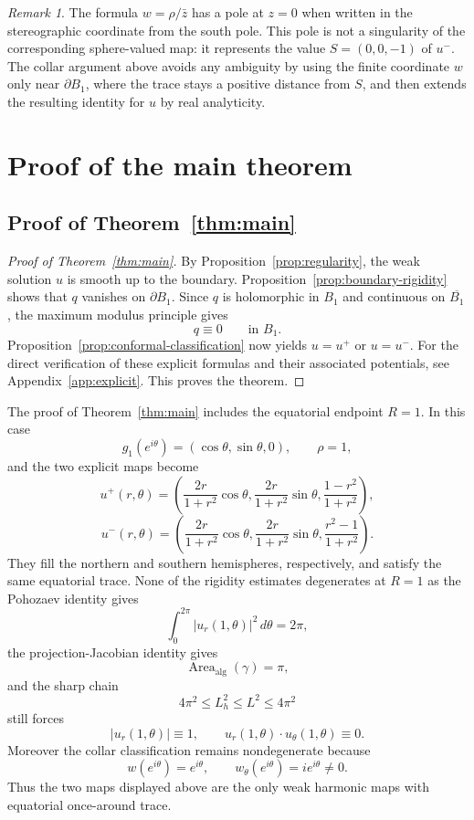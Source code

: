 \documentclass[11pt]{amsart}
\numberwithin{equation}{section}
\theoremstyle{remark}
\newtheorem*{remark}{Remark}
\newcommand{\AlgArea}{\operatorname{Area}_{\mathrm{alg}}}
\begin{document}
\begin{remark}
The formula $w=\rho/\bar z$ has a pole at $z=0$ when written in the stereographic coordinate from the south pole. This pole is not a
singularity of the corresponding sphere-valued map: it represents the value $S=(0,0,-1)$ of $u^-$. The collar argument above avoids any
ambiguity by using the finite coordinate $w$ only near $\partial B_1$, where the trace stays a positive distance from $S$, and then extends
the resulting identity for $u$ by real analyticity.
\end{remark}


\section{Proof of the main theorem}\label{sec:proof-main}
\subsection{Proof of Theorem~\ref{thm:main}}
\begin{proof}[Proof of Theorem~\ref{thm:main}]
By Proposition~\ref{prop:regularity}, the weak solution $u$ is smooth up to the boundary. Proposition~\ref{prop:boundary-rigidity} shows that
$q$ vanishes on $\partial B_1$. Since $q$ is holomorphic in $B_1$ and continuous on $\overline{B_1}$, the maximum modulus principle gives
\[
q\equiv0
\qquad\text{in }B_1.
\]
Proposition~\ref{prop:conformal-classification} now yields $u=u^+$ or $u=u^-$. For the direct verification of these explicit formulas and
their associated potentials, see Appendix~\ref{app:explicit}. This proves the theorem.
\end{proof}



The proof of Theorem~\ref{thm:main} includes the equatorial endpoint $R=1$. In this case
\[
g_1(e^{i\theta})=(\cos\theta,\sin\theta,0),
\qquad \rho=1,
\]
and the two explicit maps become
\[
u^+(r,\theta)=\left(
\frac{2r}{1+r^2}\cos\theta,
\frac{2r}{1+r^2}\sin\theta,
\frac{1-r^2}{1+r^2}
\right),
\]
\[
u^-(r,\theta)=\left(
\frac{2r}{1+r^2}\cos\theta,
\frac{2r}{1+r^2}\sin\theta,
\frac{r^2-1}{1+r^2}
\right).
\]
They fill the northern and southern hemispheres, respectively, and satisfy the same equatorial trace. None of the rigidity estimates
degenerates at $R=1$ as  the Pohozaev identity gives
\[
\int_0^{2\pi}|u_r(1,\theta)|^2\, d\theta=2\pi,
\]
the projection-Jacobian identity gives
\[
\AlgArea(\gamma)=\pi,
\]
and the sharp chain
\[
4\pi^2\le L_h^2\le L^2\le 4\pi^2
\]
still forces
\[
|u_r(1,\theta)|\equiv1,
\qquad
u_r(1,\theta)\cdot u_\theta(1,\theta)\equiv0.
\]
Moreover the collar classification remains nondegenerate because
\[
w(e^{i\theta})=e^{i\theta},
\qquad
w_\theta(e^{i\theta})=ie^{i\theta}\ne0.
\]
Thus the two maps displayed above are the only weak harmonic maps with equatorial once-around trace.
\end{document}
